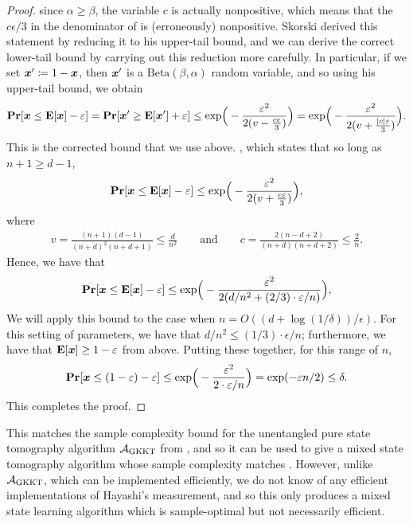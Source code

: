 \documentclass{article}
\newcommand{\gkkt}{\calA_{\mathrm{GKKT}}}
\begin{document}
\begin{proof}
{since $\alpha \geq \beta$, the variable $c$ is actually nonpositive, which means that the $c \epsilon/3$ in the denominator of  is (erroneously) nonpositive.
Skorski derived this statement by reducing it to his upper-tail bound,
and we can derive the correct lower-tail bound by carrying out this reduction more carefully.
In particular, if we set ${\boldsymbol{x}}' \coloneqq 1 - {\boldsymbol{x}}$, then ${\boldsymbol{x}}'$ is a $\mathrm{Beta}(\beta, \alpha)$ random variable,
and so using his upper-tail bound, we obtain
\begin{equation*}
    \mathop{\bf Pr\/}[{\boldsymbol{x}} \leq \mathop{\bf E\/}[{\boldsymbol{x}}] - \varepsilon] = \mathop{\bf Pr\/}[{\boldsymbol{x}}' \geq \mathop{\bf E\/}[{\boldsymbol{x}}'] + \varepsilon] 
    \leq \mathrm{exp}\Big(- \frac{\varepsilon^2}{2(v - \frac{c\varepsilon}{3})}\Big) = \mathrm{exp}\Big(- \frac{\varepsilon^2}{2(v + \frac{|c|\varepsilon}{3})}\Big).
\end{equation*}
This is the corrected bound that we use above.
}, which states that so long as $n+1 \geq d-1$,
\begin{equation*}
    \mathop{\bf Pr\/}[{\boldsymbol{x}} \leq \mathop{\bf E\/}[{\boldsymbol{x}}] - \varepsilon]
    \leq \mathrm{exp}\Big(- \frac{\varepsilon^2}{2(v + \frac{c\varepsilon}{3})}\Big),
\end{equation*}
where
\begin{align*}
    v = \frac{(n+1)(d-1)}{(n+d)^2(n+d+1)} \leq \frac{d}{n^2}
    \qquad
    \text{and}
    \qquad
    c = \frac{2(n-d+2)}{(n+d)(n+d+2)} \leq \frac{2}{n}.
\end{align*}
Hence, we have that 
\begin{equation*}
    \mathop{\bf Pr\/}[{\boldsymbol{x}} \leq \mathop{\bf E\/}[{\boldsymbol{x}}] - \varepsilon]
    \leq \mathrm{exp}\Big(- \frac{\varepsilon^2}{2(d/n^2 + (2/3) \cdot\varepsilon/n)}\Big),
\end{equation*}
We will apply this bound to the case when $n = O((d + \log(1/\delta))/\epsilon)$.
For this setting of parameters, we have that $d/n^2 \leq (1/3) \cdot \epsilon/n$; furthermore, we have that $\mathop{\bf E\/}[{\boldsymbol{x}}] \geq 1 - \varepsilon$ from  above. Putting these together, for this range of $n$,
\begin{equation*}
    \mathop{\bf Pr\/}[{\boldsymbol{x}} \leq (1-\varepsilon) - \varepsilon]
    \leq \mathrm{exp}\Big(- \frac{\varepsilon^2}{2 \cdot\varepsilon/n}\Big)
    = \exp(-\varepsilon n/2) \leq \delta.
\end{equation*} 
This completes the proof.
\end{proof}

This matches the sample complexity bound for the unentangled pure state tomography algorithm $\gkkt$ from ,
and so it can be used to give a mixed state tomography algorithm whose sample complexity matches .
However, unlike $\gkkt$,
which can be implemented efficiently,
we do not know of any efficient implementations of Hayashi's measurement,
and so this only produces a mixed state learning algorithm which is sample-optimal but not necessarily efficient.
\end{document}
